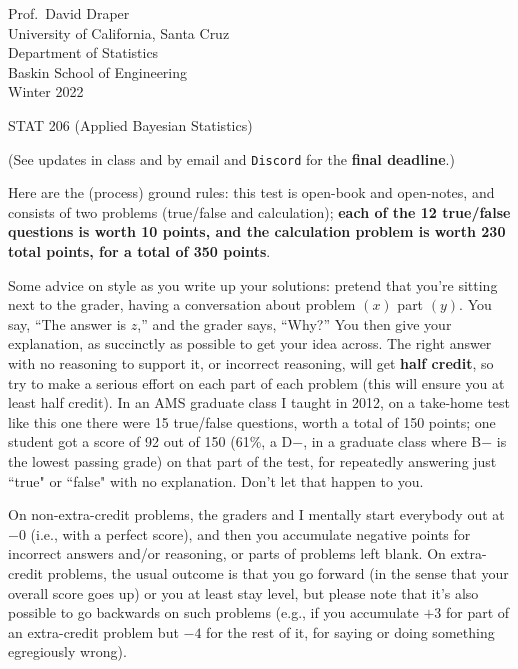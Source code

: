 \documentclass[12pt]{article}
\begin{document}
\begin{flushleft}

Prof.~David Draper \\
University of California, Santa Cruz \\
Department of Statistics \\
Baskin School of Engineering \\
Winter 2022

\end{flushleft}

\Large

\begin{center}

STAT 206 (\textsf{Applied Bayesian Statistics})


\large

(See updates in class and by email and \texttt{Discord} for the \textbf{final deadline}.)

\end{center}

\normalsize

\vspace*{-0.1in}

Here are the (process) ground rules: this test is open-book and open-notes, and
consists of two problems (true/false and calculation); \textbf{each of the 12
true/false questions is worth 10 points, and the calculation problem is
worth 230 total points, for a total of 350 points}.

Some advice on style as you write up your solutions: pretend that you're sitting next to the grader, having a conversation about problem $( x )$ part $( y )$. You say, ``The answer is $z$,'' and the grader says, ``Why?'' You then give your explanation, as succinctly as possible to get your idea across. The right answer with no reasoning to support it, or incorrect reasoning, will get \textbf{half credit}, so try to make a serious effort on each part of each problem (this will ensure you at least half credit). In an AMS graduate class I taught in 2012, on a take-home test like this one there were 15 true/false questions, worth a total of 150 points; one student got a score of 92 out of 150 (61\%, a D$-$, in a graduate class where B$-$ is the lowest passing grade) on that part of the test, for repeatedly answering just ``true" or ``false" with no explanation. Don't let that happen to you.  

On non-extra-credit problems, the graders and I mentally start everybody out at $-0$ (i.e., with a perfect score), and then you accumulate negative points for
incorrect answers and/or reasoning, or parts of problems left blank. On
extra-credit problems, the usual outcome is that you go forward (in the
sense that your overall score goes up) or you at least stay level, but
please note that it's also possible to go backwards on such problems (e.g.,
if you accumulate $+3$ for part of an extra-credit problem but $-4$ for the
rest of it, for saying or doing something egregiously wrong).
\end{document}
